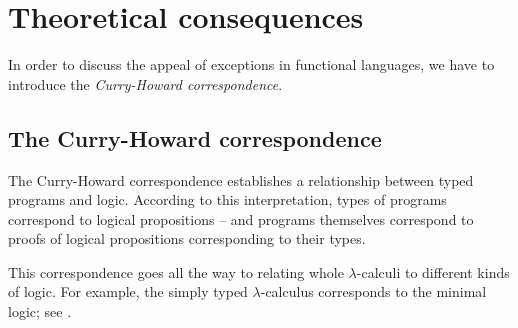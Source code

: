 
\section{Theoretical consequences}

In order to discuss the appeal of exceptions in functional languages, we have to introduce
the \emph{Curry-Howard correspondence}.

\subsection{The Curry-Howard correspondence}

The Curry-Howard correspondence establishes a relationship between typed programs and logic.
According to this interpretation, types of programs correspond to logical propositions --
and programs themselves correspond to proofs of logical propositions corresponding to their
types.

This correspondence goes all the way to relating whole $\lambda$-calculi to different
kinds of logic. For example, the simply typed $\lambda$-calculus corresponds to the minimal
logic; see .

